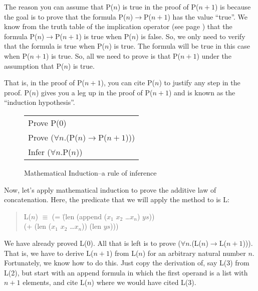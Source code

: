 The reason you can assume that P($n$) is true in the proof of P($n+1$) is because the goal is to prove that the formula P($n$)$\rightarrow$P($n+1$) has the value ``true''. We know from the truth table of the implication operator (see page \pageref{implication-truth-table}) that the formula P($n$)$\rightarrow$P($n+1$) is true when P($n$) is false. So, we only need to verify that the formula is true when P($n$) is true. The formula will be true in this case when P($n+1$) is true. So, all we need to prove is that P($n+1$) under the assumption that P($n$) is true.

That is, in the proof of P($n+1$), you can cite P($n$) to justify any step in the proof. P($n$) gives you a leg up in the proof of P($n+1$) and is known as the ``induction hypothesis''.

\begin{figure}
\begin{center}
\begin{tabular}{l}
Prove P(0) \\
Prove ($\forall$$n$.(P($n$)$\rightarrow$P($n+1$))) \\
\hline
Infer ($\forall$$n$.P($n$))
\end{tabular}
\end{center}
\caption{Mathematical Induction--a rule of inference}
\label{fig-04-01}
\end{figure}

Now, let's apply mathematical induction to prove the additive law of concatenation. Here, the predicate that we will apply the method to is L:

\begin{quote}
\begin{tabbing}
L($n$) $\equiv$ (= \=(len (append ($x_1$ $x_2$ \dots $x_n$) $ys$))  \\
                   \>(+ (len ($x_1$ $x_2$ \dots $x_n$)) (len $ys$)))
\end{tabbing}
\end{quote}

\label{len-additive-thm}
We have already proved L(0). All that is left is to prove ($\forall$$n$.(L($n$)$\rightarrow$L($n+1$))). That is, we have to derive L($n+1$) from L($n$) for an arbitrary natural number $n$. Fortunately, we know how to do this. Just copy the derivation of, say L(3) from L(2), but start with an append formula in which the first operand is a list with $n+1$ elements, and cite L($n$) where we would have cited L(3).

